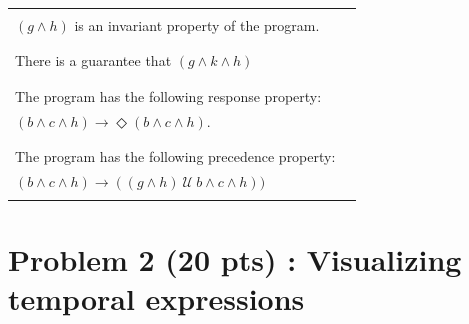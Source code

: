 \documentclass[12pt]{article}
\begin{document}
\begin{enumerate}
\begin{table}
\begin{tabular}{|l|l|}
\hline

&\\
		
$( g \wedge h)$ is an invariant property of the program.  &\\

&\\

\hline

&\\
		
There is a guarantee that $(g \wedge k \wedge h)$	 &\\

&\\

\hline

&\\
		
The program has the following response property: &\\
$(b \wedge c \wedge h) \rightarrow \Diamond (b \wedge c \wedge h)$.   &\\

&\\

\hline

&\\
		
The program has the following precedence property: &\\
$(b \wedge c \wedge h) \rightarrow ( (g \wedge h) ~\mathcal{U}~ b \wedge c \wedge h))$
			 &\\
&\\

\hline

\end{tabular}
\end{table}


\end{enumerate}


\newpage

\section*{Problem 2 (20 pts) :  Visualizing temporal expressions}
\end{document}
